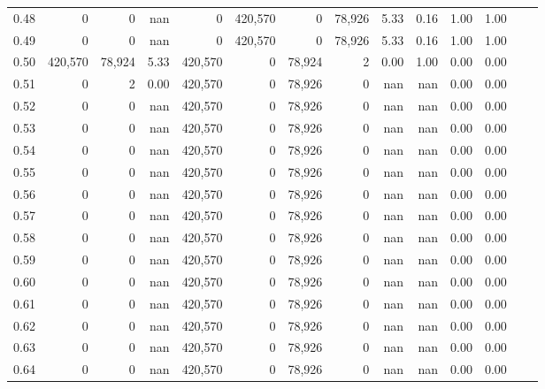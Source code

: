 \begin{tabular}{rrrrrrrrrrrrrr}
0.48 &        0 &       0 &     nan &        0 &  420,570 &       0 &  78,926 &  5.33 &  0.16 &  1.00 &      1.00 \\
0.49 &        0 &       0 &     nan &        0 &  420,570 &       0 &  78,926 &  5.33 &  0.16 &  1.00 &      1.00 \\
0.50 &  420,570 &  78,924 &    5.33 &  420,570 &        0 &  78,924 &       2 &  0.00 &  1.00 &  0.00 &      0.00 \\
0.51 &        0 &       2 &    0.00 &  420,570 &        0 &  78,926 &       0 &   nan &   nan &  0.00 &      0.00 \\
0.52 &        0 &       0 &     nan &  420,570 &        0 &  78,926 &       0 &   nan &   nan &  0.00 &      0.00 \\
0.53 &        0 &       0 &     nan &  420,570 &        0 &  78,926 &       0 &   nan &   nan &  0.00 &      0.00 \\
0.54 &        0 &       0 &     nan &  420,570 &        0 &  78,926 &       0 &   nan &   nan &  0.00 &      0.00 \\
0.55 &        0 &       0 &     nan &  420,570 &        0 &  78,926 &       0 &   nan &   nan &  0.00 &      0.00 \\
0.56 &        0 &       0 &     nan &  420,570 &        0 &  78,926 &       0 &   nan &   nan &  0.00 &      0.00 \\
0.57 &        0 &       0 &     nan &  420,570 &        0 &  78,926 &       0 &   nan &   nan &  0.00 &      0.00 \\
0.58 &        0 &       0 &     nan &  420,570 &        0 &  78,926 &       0 &   nan &   nan &  0.00 &      0.00 \\
0.59 &        0 &       0 &     nan &  420,570 &        0 &  78,926 &       0 &   nan &   nan &  0.00 &      0.00 \\
0.60 &        0 &       0 &     nan &  420,570 &        0 &  78,926 &       0 &   nan &   nan &  0.00 &      0.00 \\
0.61 &        0 &       0 &     nan &  420,570 &        0 &  78,926 &       0 &   nan &   nan &  0.00 &      0.00 \\
0.62 &        0 &       0 &     nan &  420,570 &        0 &  78,926 &       0 &   nan &   nan &  0.00 &      0.00 \\
0.63 &        0 &       0 &     nan &  420,570 &        0 &  78,926 &       0 &   nan &   nan &  0.00 &      0.00 \\
0.64 &        0 &       0 &     nan &  420,570 &        0 &  78,926 &       0 &   nan &   nan &  0.00 &      0.00 \\

\end{tabular}
